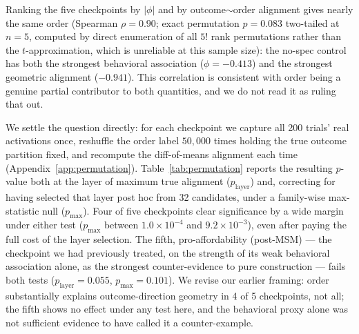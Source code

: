 \documentclass{article}
\begin{document}
Ranking the five checkpoints by $|\phi|$ and by outcome$\sim$order alignment gives nearly the same order (Spearman $\rho{=}0.90$; exact permutation $p{=}0.083$ two-tailed at $n{=}5$, computed by direct enumeration of all $5!$ rank permutations rather than the $t$-approximation, which is unreliable at this sample size): the no-spec control has both the strongest behavioral association ($\phi{=}{-}0.413$) and the strongest geometric alignment ($-0.941$). This correlation is consistent with order being a genuine partial contributor to both quantities, and we do not read it as ruling that out.

We settle the question directly: for each checkpoint we capture all 200 trials' real activations once, reshuffle the order label $50{,}000$ times holding the true outcome partition fixed, and recompute the diff-of-means alignment each time (Appendix~\ref{app:permutation}). Table~\ref{tab:permutation} reports the resulting $p$-value both at the layer of maximum true alignment ($p_{\text{layer}}$) and, correcting for having selected that layer post hoc from 32 candidates, under a family-wise max-statistic null ($p_{\max}$). Four of five checkpoints clear significance by a wide margin under either test ($p_{\max}$ between $1.0{\times}10^{-4}$ and $9.2{\times}10^{-3}$), even after paying the full cost of the layer selection. The fifth, pro-affordability (post-MSM) --- the checkpoint we had previously treated, on the strength of its weak behavioral association alone, as the strongest counter-evidence to pure construction --- fails both tests ($p_{\text{layer}}{=}0.055$, $p_{\max}{=}0.101$). We revise our earlier framing: order substantially explains outcome-direction geometry in 4 of 5 checkpoints, not all; the fifth shows no effect under any test here, and the behavioral proxy alone was not sufficient evidence to have called it a counter-example.
\end{document}
